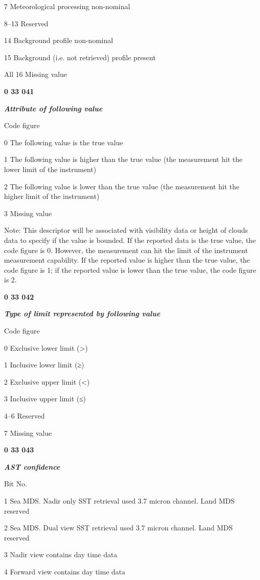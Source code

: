 7 Meteorological processing non-nominal

8--13 Reserved

14 Background profile non-nominal

15 Background (i.e. not retrieved) profile present

All 16 Missing value

\textbf{0 33 041}

\emph{\textbf{Attribute of following value}}

Code figure

0 The following value is the true value

1 The following value is higher than the true value (the measurement hit the lower limit of the instrument)

2 The following value is lower than the true value (the measurement hit the higher limit of the instrument)

3 Missing value

Note: This descriptor will be associated with visibility data or height of clouds data to specify if the value is bounded. If the reported data is the true value, the code figure is 0. However, the measurement can hit the limit of the instrument measurement capability. If the reported value is higher than the true value, the code figure is 1; if the reported value is lower than the true value, the code figure is 2.

\textbf{0 33 042}

\emph{\textbf{Type of limit represented by following value}}

Code figure

0 Exclusive lower limit (\textgreater)

1 Inclusive lower limit (≥)

2 Exclusive upper limit (\textless)

3 Inclusive upper limit (≤)

4--6 Reserved

7 Missing value

\textbf{0 33 043}

\emph{\textbf{AST confidence}}

Bit No.

1 Sea MDS. Nadir only SST retrieval used 3.7 micron channel. Land MDS reserved

2 Sea MDS. Dual view SST retrieval used 3.7 micron channel. Land MDS reserved

3 Nadir view contains day time data

4 Forward view contains day time data

